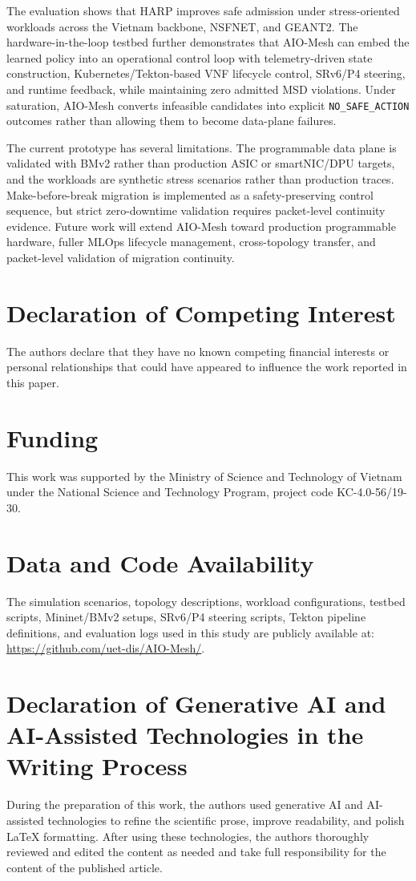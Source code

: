 \documentclass[final,5p]{elsarticle}
\begin{document}
The evaluation shows that HARP improves safe admission under stress-oriented workloads across the Vietnam backbone, NSFNET, and GEANT2. The hardware-in-the-loop testbed further demonstrates that AIO-Mesh can embed the learned policy into an operational control loop with telemetry-driven state construction, Kubernetes/Tekton-based VNF lifecycle control, SRv6/P4 steering, and runtime feedback, while maintaining zero admitted MSD violations. Under saturation, AIO-Mesh converts infeasible candidates into explicit \texttt{NO\_SAFE\_ACTION} outcomes rather than allowing them to become data-plane failures.

The current prototype has several limitations. The programmable data plane is validated with BMv2 rather than production ASIC or smartNIC/DPU targets, and the workloads are synthetic stress scenarios rather than production traces. Make-before-break migration is implemented as a safety-preserving control sequence, but strict zero-downtime validation requires packet-level continuity evidence. Future work will extend AIO-Mesh toward production programmable hardware, fuller MLOps lifecycle management, cross-topology transfer, and packet-level validation of migration continuity.


\section*{Declaration of Competing Interest}
\noindent The authors declare that they have no known competing financial interests or personal relationships that could have appeared to influence the work reported in this paper.


\section*{Funding}
This work was supported by the Ministry of Science and Technology of Vietnam under the National Science and Technology Program, project code KC-4.0-56/19-30.

\section*{Data and Code Availability}
The simulation scenarios, topology descriptions, workload configurations, testbed scripts, Mininet/BMv2 setups, SRv6/P4 steering scripts, Tekton pipeline definitions, and evaluation logs used in this study are publicly available at:
\url{https://github.com/uet-dis/AIO-Mesh/}.

\section*{Declaration of Generative AI and AI-Assisted Technologies in the Writing Process}
During the preparation of this work, the authors used generative AI and AI-assisted technologies to refine the scientific prose, improve readability, and polish LaTeX formatting. After using these technologies, the authors thoroughly reviewed and edited the content as needed and take full responsibility for the content of the published article.
\end{document}
